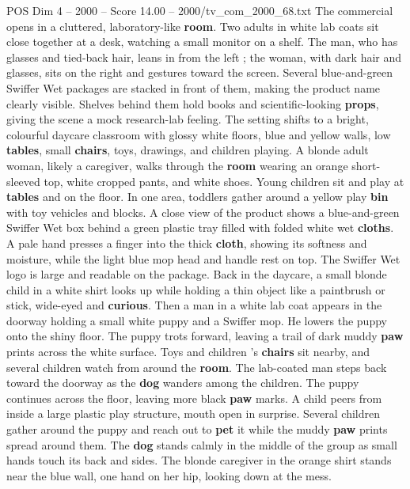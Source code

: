 \begin{textsample}{POS Dim 4 – 2000 – Score 14.00 – 2000/tv\_com\_2000\_68.txt}  \label{ex:f4_pos_055}
The commercial opens in a cluttered, laboratory-like \textbf{room}.
Two adults in white lab coats sit close together at a desk, watching a small monitor on a shelf.
The man, who has glasses and tied-back hair, leans in from the left ; the woman, with dark hair and glasses, sits on the right and gestures toward the screen.
Several blue-and-green Swiffer Wet packages are stacked in front of them, making the product name clearly visible.
Shelves behind them hold books and scientific-looking \textbf{props}, giving the scene a mock research-lab feeling.
The setting shifts to a bright, colourful daycare classroom with glossy white floors, blue and yellow walls, low \textbf{tables}, small \textbf{chairs}, toys, drawings, and children playing.
A blonde adult woman, likely a caregiver, walks through the \textbf{room} wearing an orange short-sleeved top, white cropped pants, and white shoes.
Young children sit and play at \textbf{tables} and on the floor.
In one area, toddlers gather around a yellow play \textbf{bin} with toy vehicles and blocks.
A close view of the product shows a blue-and-green Swiffer Wet box behind a green plastic tray filled with folded white wet \textbf{cloths}.
A pale hand presses a finger into the thick \textbf{cloth}, showing its softness and moisture, while the light blue mop head and handle rest on top.
The Swiffer Wet logo is large and readable on the package.
Back in the daycare, a small blonde child in a white shirt looks up while holding a thin object like a paintbrush or stick, wide-eyed and \textbf{curious}.
Then a man in a white lab coat appears in the doorway holding a small white puppy and a Swiffer mop.
He lowers the puppy onto the shiny floor.
The puppy trots forward, leaving a trail of dark muddy \textbf{paw} prints across the white surface.
Toys and children ’s \textbf{chairs} sit nearby, and several children watch from around the \textbf{room}.
The lab-coated man steps back toward the doorway as the \textbf{dog} wanders among the children.
The puppy continues across the floor, leaving more black \textbf{paw} marks.
A child peers from inside a large plastic play structure, mouth open in surprise.
Several children gather around the puppy and reach out to \textbf{pet} it while the muddy \textbf{paw} prints spread around them.
The \textbf{dog} stands calmly in the middle of the group as small hands touch its back and sides.
The blonde caregiver in the orange shirt stands near the blue wall, one hand on her hip, looking down at the mess.

\end{textsample}
